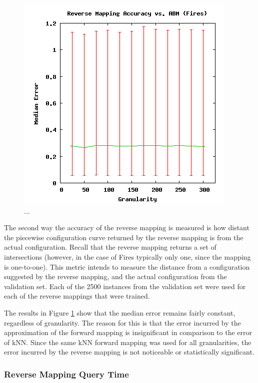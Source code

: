 \begin{figure}[ht]
\centering
\includegraphics[scale=.5]{images/results_fires/rmaccabm.png}
\caption{...}
\label{fig:rmaccabm}
\end{figure}
The second way the accuracy of the reverse mapping is measured is how distant the piecewise configuration curve returned by the reverse mapping is from the actual configuration.
Recall that the reverse mapping returns a set of intersections (however, in the case of Fires typically only one, since the mapping is one-to-one).
This metric intends to measure the distance from a configuration suggested by the reverse mapping, and the actual configuration from the validation set.
Each of the 2500 instances from the validation set were used for each of the reverse mappings that were trained.

The results in Figure \ref{fig:rmaccabm} show that the median error remains fairly constant, regardless of granularity.
The reason for this is that the error incurred by the approximation of the forward mapping is insignificant in comparison to the error of kNN.
Since the same kNN forward mapping was used for all granularities, the error incurred by the reverse mapping is not noticeable or statistically significant.


\subsubsection{Reverse Mapping Query Time}


